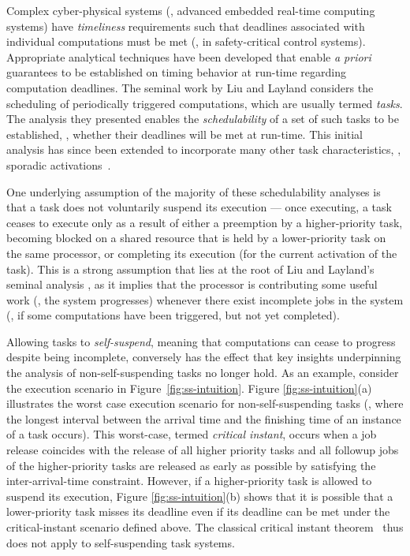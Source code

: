 \label{sec:intro}

Complex cyber-physical systems (\ie, advanced embedded real-time computing systems) have \emph{timeliness} requirements %
such that  deadlines associated with individual computations must be met (\eg, in safety-critical control systems). Appropriate analytical techniques have been developed that enable \emph{a priori} guarantees to be established on timing behavior at run-time regarding computation deadlines.  
The seminal work by Liu and Layland \cite{Liu_1973} considers the scheduling of periodically triggered computations, which are usually termed \emph{tasks}. 
The analysis they presented enables the \emph{schedulability} of a set of such tasks to be established, \ie, whether their deadlines will be met at run-time. This initial analysis has since been extended to incorporate many other task characteristics, \eg, sporadic activations~\cite{Mok:1983:FDP:888951}. 

One underlying assumption of the majority of these schedulability analyses is that a task does not voluntarily suspend its execution --- once executing, a task ceases to execute only as a result of either a preemption by a higher-priority task, becoming blocked on a shared resource that is held by a lower-priority task on the same processor, or completing its execution (for the current activation of the task). This is a strong assumption that lies at the root of Liu and Layland's seminal analysis \cite{Liu_1973}, as it implies that the processor is contributing some useful work (\ie, the system progresses) whenever there exist incomplete jobs in the system (\ie, if some computations have been triggered, but not yet completed). 

Allowing tasks to \emph{self-suspend}, meaning that computations can cease to progress despite being incomplete, conversely has the effect that key insights underpinning the analysis of non-self-suspending tasks no longer hold. As an example, consider the execution scenario in Figure~\ref{fig:ss-intuition}. Figure \ref{fig:ss-intuition}(a) illustrates the worst case execution scenario for non-self-suspending tasks (\ie, where the longest interval between the arrival time and the finishing time of an instance of a task occurs). This worst-case, termed \emph{critical instant}, occurs when a job release coincides with the release of all higher priority tasks and all followup jobs of the higher-priority tasks are released as early as possible by satisfying the inter-arrival-time constraint. However, if a higher-priority task is allowed to suspend its execution, Figure \ref{fig:ss-intuition}(b) shows that it is possible that a lower-priority task misses its deadline even if its deadline can be met under the critical-instant scenario defined above. The classical critical instant theorem~\cite{Liu_1973} thus does not apply to self-suspending task systems.


